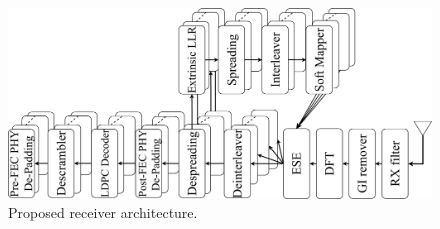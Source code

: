 \begin{figure}[H]
	\centering
	\includegraphics[width=0.75\linewidth]{figure/chap3/Proposed_Receiver.pdf}
	\caption{Proposed receiver architecture.}
	\label{fig:OFDMA-IDMARx}
\end{figure}